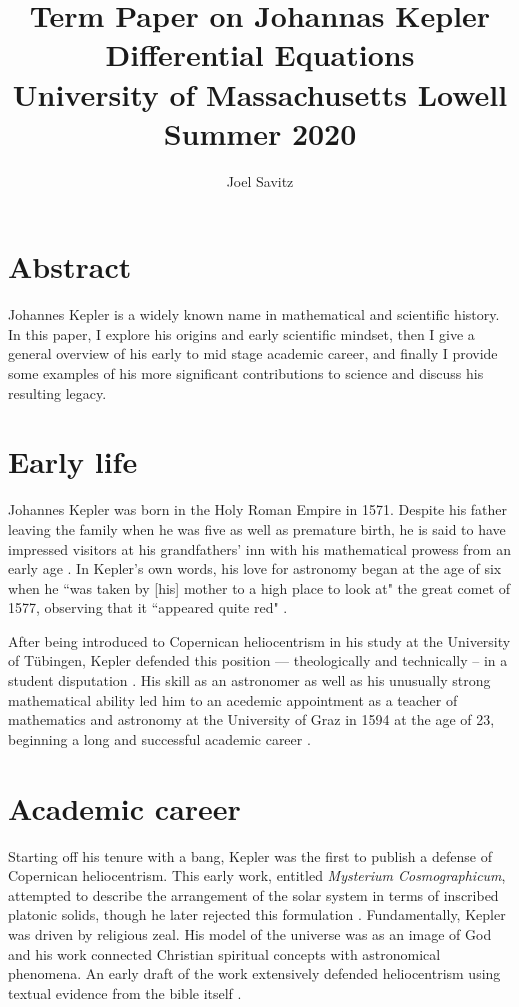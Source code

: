 \documentclass[11pt]{article}
\title{Term Paper on Johannas Kepler \\
\small Differential Equations \\
University of Massachusetts Lowell \\
Summer 2020}
\author{Joel Savitz}
\begin{document}
\maketitle

\section{Abstract}

Johannes Kepler is a widely known name
in mathematical and scientific history.
In this paper, I explore his origins
and early scientific mindset,
then I give a general overview of
his early to mid stage academic career,
and finally I provide some examples
of his more significant contributions
to science and discuss his resulting legacy.

\section{Early life}

Johannes Kepler was born in the Holy Roman Empire in 1571.
Despite his father leaving the family when he was five
as well as premature birth, 
he is said to have impressed visitors at his
grandfathers' inn with his mathematical prowess
from an early age \cite{caspar}.
In Kepler's own words,
his love for astronomy began at the age of six
when he ``was taken by [his] mother to a high place to look at"
the great comet of 1577, observing that
it ``appeared quite red" \cite{koestler}.


After being introduced to Copernican heliocentrism
in his study at the University of Tübingen,
Kepler defended this position
--- theologically and technically --
in a student disputation \cite{westman}.
His skill as an astronomer as well as
his unusually strong mathematical ability
led him to an acedemic appointment
as a teacher of mathematics and astronomy
at the University of Graz in 1594
at the age of 23,
beginning a long and successful academic career \cite{caspar}.

\section{Academic career}

Starting off his tenure with a bang,
Kepler was the first to publish a defense
of Copernican heliocentrism.
This early work,
entitled \textit{Mysterium Cosmographicum},
attempted to describe
the arrangement of the solar system
in terms of inscribed platonic solids,
though he later rejected this formulation \cite{caspar}.
Fundamentally, Kepler was driven by religious zeal.
His model of the universe was as an image of God
and his work connected Christian spiritual concepts
with astronomical phenomena.
An early draft of the work
extensively defended heliocentrism
using textual evidence from the bible itself \cite{barker}.
\end{document}
